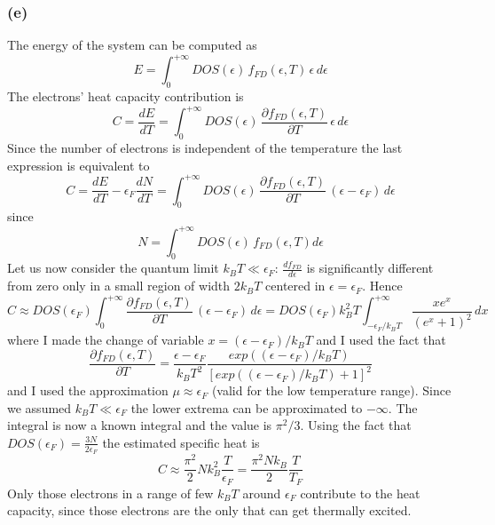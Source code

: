 \documentclass{article}
\begin{document}
\subsubsection*{(e)}
The energy of the system can be computed as 
\begin{equation*}
    E = \int_0^{+\infty} DOS(\epsilon) \, f_{FD}(\epsilon, T) \, \epsilon \, d\epsilon
\end{equation*}
The electrons' heat capacity contribution is
\begin{equation*}
    C = \frac{dE}{dT} = \int_0^{+\infty} DOS(\epsilon) \, \frac{\partial f_{FD}(\epsilon, T)}{\partial T} \, \epsilon \, d\epsilon
\end{equation*}
Since the number of electrons is independent of the temperature the last expression is equivalent to 
\begin{equation*}
    C = \frac{dE}{dT} - \epsilon_F\frac{dN}{dT} = \int_0^{+\infty} DOS(\epsilon) \, \frac{\partial f_{FD}(\epsilon, T)}{\partial T} \, (\epsilon -\epsilon_F) \, d\epsilon
\end{equation*}
since 
\begin{equation*}
    N =\int_0^{+\infty} DOS(\epsilon) \, f_{FD}(\epsilon, T) d\epsilon
\end{equation*}
Let us now consider the quantum limit $k_BT \ll \epsilon_F$: $\frac{df_{FD}}{d\epsilon}$ is significantly different from zero only 
in a small region of width $2k_BT$ centered in $\epsilon=\epsilon_F$. Hence
\begin{equation*}
    C \approx DOS(\epsilon_F) \int_0^{+\infty} \frac{\partial f_{FD}(\epsilon, T)}{\partial T} \, (\epsilon - \epsilon_F) \, d\epsilon = 
    DOS(\epsilon_F) k_B^2T \int_{-\epsilon_F/k_BT}^{+\infty} \frac{xe^x}{(e^x + 1)^2} \, dx 
\end{equation*}
where I made the change of variable $x=(\epsilon - \epsilon_F)/k_BT$ and I used the fact that 
\begin{equation*}
    \frac{\partial f_{FD}(\epsilon, T)}{\partial T} = \frac{\epsilon - \epsilon_F}{k_BT^2} \frac{exp((\epsilon - \epsilon_F)/k_BT)}{[exp((\epsilon - \epsilon_F)/k_BT) + 1]^2}
\end{equation*}
and I used the approximation $\mu \approx \epsilon_F$ (valid for the low temperature range).
Since we assumed $k_BT \ll \epsilon_F$ the lower extrema can be approximated to $-\infty$. The integral is now a known integral and the value is $\pi^2/3$. Using the fact that 
$DOS(\epsilon_F) = \frac{3N}{2\epsilon_F}$ the estimated specific heat is 
\begin{equation*}
    C \approx \frac{\pi^2}{2} N k_B^2 \frac{T}{\epsilon_F} = \frac{\pi^2Nk_B}{2}\frac{T}{T_F}
\end{equation*}
Only those electrons in a range of few $k_BT$ around $\epsilon_F$ contribute to the heat capacity, since those electrons are 
the only that can get thermally excited.
\end{document}

